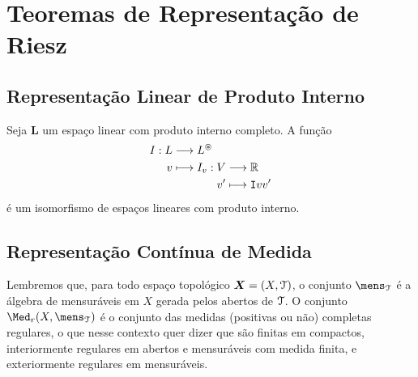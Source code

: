 \section{Teoremas de Representação de Riesz}

\subsection{Representação Linear de Produto Interno}

\begin{prop}
Seja $\bm L$ um espaço linear com produto interno completo. A função
	\begin{align*}
	{I}: {L} &\longrightarrow {L^\circledast} \\{v} &\longmapsto {
		\begin{aligned}[t]
		 {I_v}: {V} &\longrightarrow{\mathbb{R}} \\{v'} &\longmapsto{\mathtt I{v}{v'}} 
		\end{aligned}
	}
	\end{align*}
é um isomorfismo de espaços lineares com produto interno.
\end{prop}

\subsection{Representação Contínua de Medida}

Lembremos que, para todo espaço topológico $\bm X = (X,\mathcal{T})$, o conjunto $\mens_\topo$ é a álgebra de mensuráveis em $X$ gerada pelos abertos de $\mathcal{T}$. O conjunto $\Med_r(X,\mens_\topo)$ é o conjunto das medidas (positivas ou não) completas regulares, o que nesse contexto quer dizer que são finitas em compactos, interiormente regulares em abertos e mensuráveis com medida finita, e exteriormente regulares em mensuráveis.


